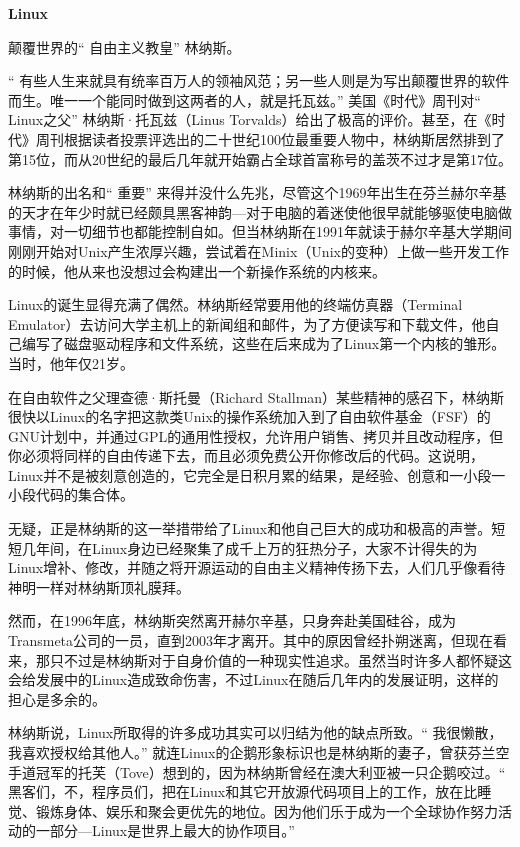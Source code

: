 \documentclass[doctor,openright,twoside]{sjtuthesis}
\theoremstyle{plain}
\theoremstyle{definition}
\theoremstyle{remark}
\theoremstyle{ocrenumbox}
\theoremstyle{plain}
\begin{document}
\textbf{Linux}

颠覆世界的`` 自由主义教皇'' 林纳斯。

`` 有些人生来就具有统率百万人的领袖风范；另一些人则是为写出颠覆世界的软件而生。唯一一个能同时做到这两者的人，就是托瓦兹。'' 美国《时代》周刊对`` Linux之父'' 林纳斯·托瓦兹（Linus Torvalds）给出了极高的评价。甚至，在《时代》周刊根据读者投票评选出的二十世纪100位最重要人物中，林纳斯居然排到了第15位，而从20世纪的最后几年就开始霸占全球首富称号的盖茨不过才是第17位。

林纳斯的出名和`` 重要'' 来得并没什么先兆，尽管这个1969年出生在芬兰赫尔辛基的天才在年少时就已经颇具黑客神韵---对于电脑的着迷使他很早就能够驱使电脑做事情，对一切细节也都能控制自如。但当林纳斯在1991年就读于赫尔辛基大学期间刚刚开始对Unix产生浓厚兴趣，尝试着在Minix（Unix的变种）上做一些开发工作的时候，他从来也没想过会构建出一个新操作系统的内核来。

Linux的诞生显得充满了偶然。林纳斯经常要用他的终端仿真器（Terminal Emulator）去访问大学主机上的新闻组和邮件，为了方便读写和下载文件，他自己编写了磁盘驱动程序和文件系统，这些在后来成为了Linux第一个内核的雏形。当时，他年仅21岁。

在自由软件之父理查德·斯托曼（Richard Stallman）某些精神的感召下，林纳斯很快以Linux的名字把这款类Unix的操作系统加入到了自由软件基金（FSF）的GNU计划中，并通过GPL的通用性授权，允许用户销售、拷贝并且改动程序，但你必须将同样的自由传递下去，而且必须免费公开你修改后的代码。这说明，Linux并不是被刻意创造的，它完全是日积月累的结果，是经验、创意和一小段一小段代码的集合体。

无疑，正是林纳斯的这一举措带给了Linux和他自己巨大的成功和极高的声誉。短短几年间，在Linux身边已经聚集了成千上万的狂热分子，大家不计得失的为Linux增补、修改，并随之将开源运动的自由主义精神传扬下去，人们几乎像看待神明一样对林纳斯顶礼膜拜。

然而，在1996年底，林纳斯突然离开赫尔辛基，只身奔赴美国硅谷，成为Transmeta公司的一员，直到2003年才离开。其中的原因曾经扑朔迷离，但现在看来，那只不过是林纳斯对于自身价值的一种现实性追求。虽然当时许多人都怀疑这会给发展中的Linux造成致命伤害，不过Linux在随后几年内的发展证明，这样的担心是多余的。

林纳斯说，Linux所取得的许多成功其实可以归结为他的缺点所致。`` 我很懒散，我喜欢授权给其他人。'' 就连Linux的企鹅形象标识也是林纳斯的妻子，曾获芬兰空手道冠军的托芙（Tove）想到的，因为林纳斯曾经在澳大利亚被一只企鹅咬过。`` 黑客们，不，程序员们，把在Linux和其它开放源代码项目上的工作，放在比睡觉、锻炼身体、娱乐和聚会更优先的地位。因为他们乐于成为一个全球协作努力活动的一部分---Linux是世界上最大的协作项目。''
\end{document}
